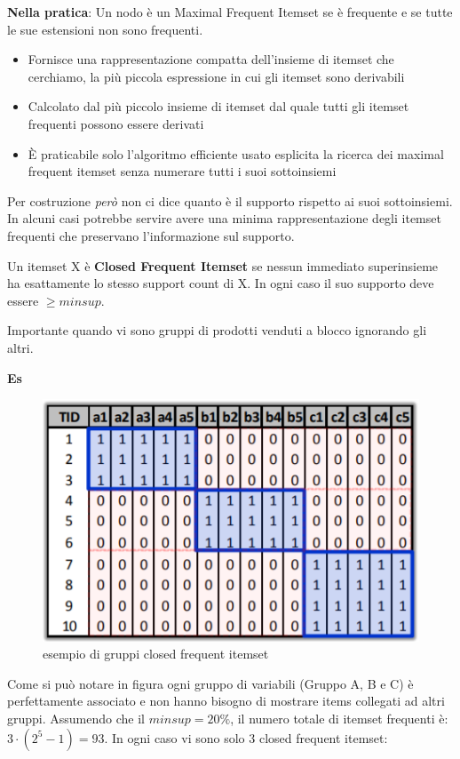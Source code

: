 \textbf{Nella pratica}: Un nodo \`e un Maximal Frequent Itemset se \`e frequente e se tutte le sue estensioni non sono frequenti.\\
\begin{itemize}
	\item Fornisce una rappresentazione compatta dell'insieme di itemset che cerchiamo, la pi\`u piccola espressione in cui gli itemset sono derivabili
	\item Calcolato dal più piccolo insieme di itemset dal quale tutti gli itemset frequenti possono essere derivati
	\item È praticabile solo l'algoritmo efficiente usato esplicita la ricerca dei maximal frequent itemset senza numerare tutti i suoi sottoinsiemi
\end{itemize}
Per costruzione \textit{per\`o} non ci dice quanto \`e il supporto rispetto ai suoi sottoinsiemi. In alcuni casi potrebbe servire avere una minima rappresentazione degli itemset frequenti che preservano l'informazione sul supporto.

\begin{defn}
	Un itemset X è \textbf{Closed Frequent Itemset} se nessun immediato superinsieme ha esattamente lo stesso support count di X. In ogni caso il suo supporto deve essere $\ge minsup$.
\end{defn}
Importante quando vi sono gruppi di prodotti venduti a blocco ignorando gli altri.

\textbf{Es}
\begin{figure}[H]
	\centering
	\includegraphics[height=0.5 \linewidth]{association/pict/close_freq_itemset.png}
	\caption{esempio di gruppi closed frequent itemset}
\end{figure}

Come si può notare in figura ogni gruppo di variabili (Gruppo A, B e C) è perfettamente associato e non hanno bisogno di mostrare items collegati ad altri gruppi. Assumendo che il $minsup = 20\%$, il numero totale di itemset frequenti è: $3 \cdot (2^5 -1) = 93$. In ogni caso vi sono solo 3 closed frequent itemset: 


